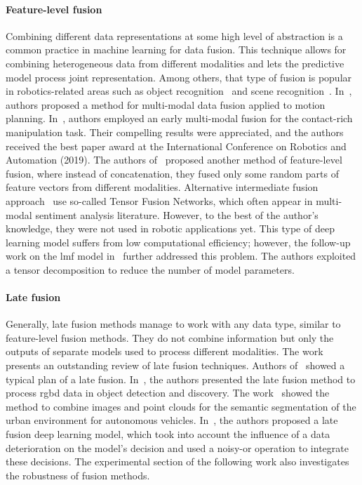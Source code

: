 \documentclass[a4paper, 10pt, twoside]{report}
\begin{document}
\paragraph{Feature-level fusion} Combining different data representations at some high level of abstraction is a common practice in machine learning for data fusion. This technique allows for combining heterogeneous data from different modalities and lets the predictive model process joint representation. Among others, that type of fusion is popular in robotics-related areas such as object recognition~\cite{mid_object_recognition} and scene recognition~\cite{mid_scene_recognition}. In~\cite{mid_planning}, authors proposed a method for multi-modal data fusion applied to motion planning. In~\cite{Lee_ICRA19}, authors employed an early multi-modal fusion for the contact-rich manipulation task. Their compelling results were appreciated, and the authors received the best paper award at the International Conference on Robotics and Automation (2019). The authors of~\cite{mid_robust} proposed another method of feature-level fusion, where instead of concatenation, they fused only some random parts of feature vectors from different modalities. Alternative intermediate fusion approach~\cite{mid_LMF, mid_HPFN} use so-called Tensor Fusion Networks, which often appear in multi-modal sentiment analysis literature. However, to the best of the author's knowledge, they were not used in robotic applications yet. This type of deep learning model suffers from low computational efficiency; however, the follow-up work on the \acrshort{lmf} model in~\cite{mid_ELMF} further addressed this problem. The authors exploited a tensor decomposition to reduce the number of model parameters.

\paragraph{Late fusion} Generally, late fusion methods manage to work with any data type, similar to feature-level fusion methods. They do not combine information but only the outputs of separate models used to process different modalities. The work~\cite{Kittler98} presents an outstanding review of late fusion techniques. Authors of~\cite{late_ss, late_object_recognition, late_object_candidates} showed a typical plan of a late fusion. In~\cite{late_object_recognition,late_object_candidates}, the authors presented the late fusion method to process \acrshort{rgbd} data in object detection and discovery. The work~\cite{late_ss} showed the method to combine images and point clouds for the semantic segmentation of the urban environment for autonomous vehicles. In~\cite{late_uno}, the authors proposed a late fusion deep learning model, which took into account the influence of a data deterioration on the model's decision and used a noisy-or operation to integrate these decisions. The experimental section of the following work also investigates the robustness of fusion methods.
\end{document}
